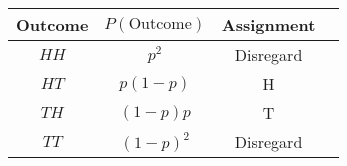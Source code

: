 \begin{tabular}{c c c c}
\hline
Outcome & $P\left(\text{Outcome}\right)$ & Assignment \\
\hline
\hline
$HH$ & $p^{2}$ & Disregard \\
$HT$ & $p\left(1-p\right)$ & H \\
$TH$ & $\left(1-p\right)p$ & T \\
$TT$ & $\left(1-p\right)^{2}$ & Disregard \\
\end{tabular}
